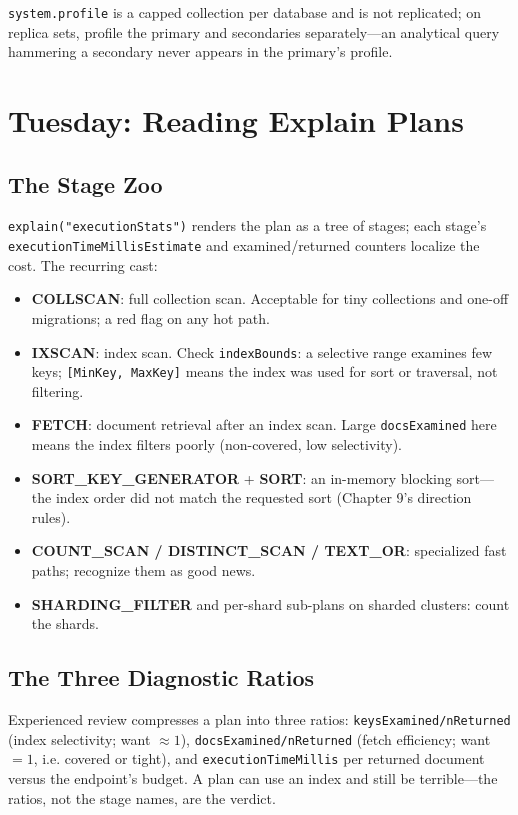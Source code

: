 \begin{tipbox}
\texttt{system.profile} is a capped collection per database and is not replicated; on replica sets, profile the primary and secondaries separately---an analytical query hammering a secondary never appears in the primary's profile.
\end{tipbox}

\section{Tuesday: Reading Explain Plans}
\subsection{The Stage Zoo}
\texttt{explain("executionStats")} renders the plan as a tree of stages; each stage's \texttt{executionTimeMillisEstimate} and examined/returned counters localize the cost. The recurring cast:

\begin{itemize}
    \item \textbf{COLLSCAN}: full collection scan. Acceptable for tiny collections and one-off migrations; a red flag on any hot path.
    \item \textbf{IXSCAN}: index scan. Check \texttt{indexBounds}: a selective range examines few keys; \texttt{[MinKey, MaxKey]} means the index was used for sort or traversal, not filtering.
    \item \textbf{FETCH}: document retrieval after an index scan. Large \texttt{docsExamined} here means the index filters poorly (non-covered, low selectivity).
    \item \textbf{SORT\_KEY\_GENERATOR} + \textbf{SORT}: an in-memory blocking sort---the index order did not match the requested sort (Chapter 9's direction rules).
    \item \textbf{COUNT\_SCAN / DISTINCT\_SCAN / TEXT\_OR}: specialized fast paths; recognize them as good news.
    \item \textbf{SHARDING\_FILTER} and per-shard sub-plans on sharded clusters: count the shards.
\end{itemize}

\subsection{The Three Diagnostic Ratios}
Experienced review compresses a plan into three ratios: \texttt{keysExamined/nReturned} (index selectivity; want $\approx 1$), \texttt{docsExamined/nReturned} (fetch efficiency; want $=1$, i.e. covered or tight), and \texttt{executionTimeMillis} per returned document versus the endpoint's budget. A plan can use an index and still be terrible---the ratios, not the stage names, are the verdict.

